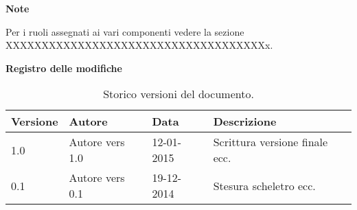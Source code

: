 \begin{large}
	\textbf{Note}
\end{large}
Per i ruoli assegnati ai vari componenti vedere la sezione XXXXXXXXXXXXXXXXXXXXXXXXXXXXXXXXXXXXx.\\



\begin{Large}
	\textbf{Registro delle modifiche}
\end{Large}

\begin{table}[h]
\begin{center}
\begin{tabular}{|l|l|l|l|}
\hline
\textbf{Versione} & \textbf{Autore} & \textbf{Data} & \textbf{Descrizione} \\
\hline
1.0 & Autore vers 1.0 & 12-01-2015 & Scrittura versione finale ecc. \\
\hline
0.1 & Autore vers 0.1 & 19-12-2014 & Stesura scheletro ecc. \\
\hline
\end{tabular}
\caption{Storico versioni del documento.}
\end{center}
\end{table}
